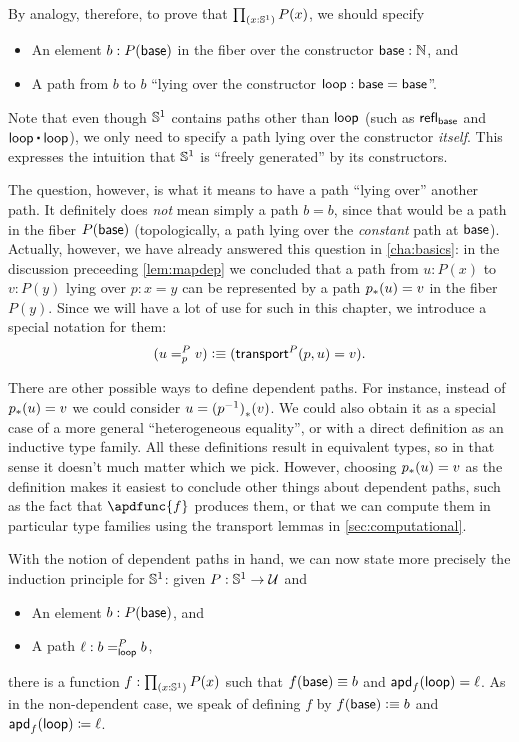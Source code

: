 By analogy, therefore, to prove that $\prd{x:\Sn^1} P(x)$, we should specify
\begin{itemize}
\item An element $b:P(\base)$ in the fiber over the constructor $\base:\nat$, and
\item A path from $b$ to $b$ ``lying over the constructor $\lloop:\base=\base$''.
\end{itemize}
Note that even though $\Sn^1$ contains paths other than $\lloop$ (such as $\refl{\base}$ and $\lloop\ct\lloop$), we only need to specify a path lying over the constructor \emph{itself}.
This expresses the intuition that $\Sn^1$ is ``freely generated'' by its constructors.

The question, however, is what it means to have a path ``lying over'' another path.
It definitely does \emph{not} mean simply a path $b=b$, since that would be a path in the fiber $P(\base)$ (topologically, a path lying over the \emph{constant} path at $\base$).
Actually, however, we have already answered this question in \autoref{cha:basics}: in the discussion preceeding \autoref{lem:mapdep} we concluded that a path from $u:P(x)$ to $v:P(y)$ lying over $p:x=y$ can be represented by a path $\trans p u = v$ in the fiber $P(y)$.
Since we will have a lot of use for such  in this chapter, we introduce a special notation for them:
\begin{equation}
  (\dpath P p u v) \defeq (\transfib{P} p u = v).\label{eq:dpath}
\end{equation}

\begin{rmk}
There are other possible ways to define dependent paths.
For instance, instead of $\trans p u = v$ we could consider $u = \trans{(\opp p)}{v}$.
We could also obtain it as a special case of a more general ``heterogeneous equality'', or with a direct definition as an inductive type family.
All these definitions result in equivalent types, so in that sense it doesn't much matter which we pick.
However, choosing $\trans p u = v$ as the definition makes it easiest to conclude other things about dependent paths, such as the fact that $\apdfunc{f}$ produces them, or that we can compute them in particular type families using the transport lemmas in \autoref{sec:computational}.
\end{rmk}

With the notion of dependent paths in hand, we can now state more precisely the induction principle for $\Sn^1$: given $P:\Sn^1\to\type$ and
\begin{itemize}
\item An element $b:P(\base)$, and
\item A path $\ell : \dpath P \lloop b b$,
\end{itemize}
there is a function $f:\prd{x:\Sn^1} P(x)$ such that $f(\base)\jdeq b$ and $\apd f \lloop = \ell$.
As in the non-dependent case, we speak of defining $f$ by $f(\base)\defeq b$ and $\apd f \lloop \defid \ell$.

